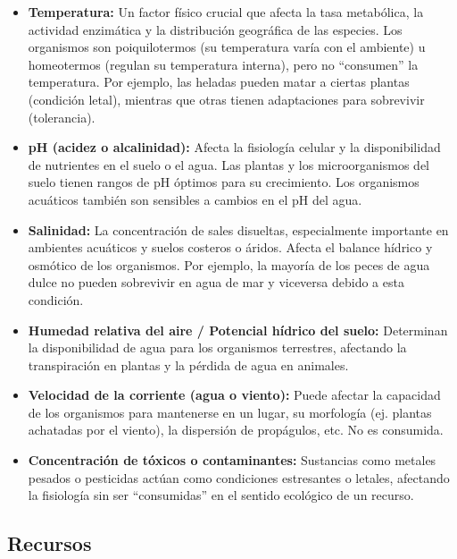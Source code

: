 \documentclass[
]{book}
\providecommand{\tightlist}{%
  \setlength{\itemsep}{0pt}\setlength{\parskip}{0pt}}
\begin{document}
\begin{itemize}
  \begin{itemize}
  \tightlist
  \item
    \textbf{Temperatura:} Un factor físico crucial que afecta la tasa metabólica, la actividad enzimática y la distribución geográfica de las especies. Los organismos son poiquilotermos (su temperatura varía con el ambiente) u homeotermos (regulan su temperatura interna), pero no ``consumen'' la temperatura. Por ejemplo, las heladas pueden matar a ciertas plantas (condición letal), mientras que otras tienen adaptaciones para sobrevivir (tolerancia).
  \item
    \textbf{pH (acidez o alcalinidad):} Afecta la fisiología celular y la disponibilidad de nutrientes en el suelo o el agua. Las plantas y los microorganismos del suelo tienen rangos de pH óptimos para su crecimiento. Los organismos acuáticos también son sensibles a cambios en el pH del agua.
  \item
    \textbf{Salinidad:} La concentración de sales disueltas, especialmente importante en ambientes acuáticos y suelos costeros o áridos. Afecta el balance hídrico y osmótico de los organismos. Por ejemplo, la mayoría de los peces de agua dulce no pueden sobrevivir en agua de mar y viceversa debido a esta condición.
  \item
    \textbf{Humedad relativa del aire / Potencial hídrico del suelo:} Determinan la disponibilidad de agua para los organismos terrestres, afectando la transpiración en plantas y la pérdida de agua en animales.
  \item
    \textbf{Velocidad de la corriente (agua o viento):} Puede afectar la capacidad de los organismos para mantenerse en un lugar, su morfología (ej. plantas achatadas por el viento), la dispersión de propágulos, etc. No es consumida.
  \item
    \textbf{Concentración de tóxicos o contaminantes:} Sustancias como metales pesados o pesticidas actúan como condiciones estresantes o letales, afectando la fisiología sin ser ``consumidas'' en el sentido ecológico de un recurso.
  \end{itemize}
\end{itemize}

\subsection*{\texorpdfstring{\textbf{Recursos}}{Recursos}}\label{recursos}
\end{document}
